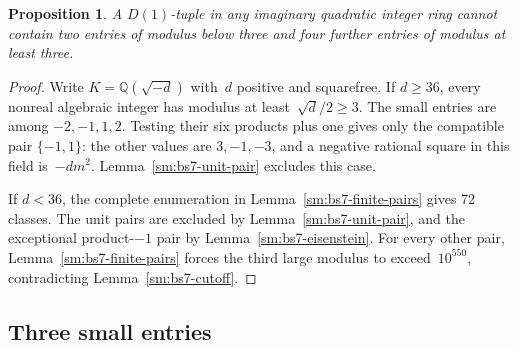 \documentclass[12pt]{article}
\newtheorem{proposition}[theorem]{Proposition}
\numberwithin{equation}{section}
\begin{document}
\begin{proposition}\label{sm:five-two-small-four-large}
A $D(1)$-tuple in any imaginary quadratic integer ring cannot contain two entries of modulus below three and four further entries of modulus at least three.
\end{proposition}
\begin{proof}
Write $K=\mathbb Q(\sqrt{-d})$ with~$d$ positive and squarefree. If $d\ge36$, every nonreal algebraic integer has modulus at least~$\sqrt d/2\ge3$. The small entries are among $-2,-1,1,2$. Testing their six products plus one gives only the compatible pair $\{-1,1\}$: the other values are $3,-1,-3$, and a negative rational square in this field is~$-dm^2$. Lemma~\ref{sm:bs7-unit-pair} excludes this case.

If $d<36$, the complete enumeration in Lemma~\ref{sm:bs7-finite-pairs} gives 72 classes. The unit pairs are excluded by Lemma~\ref{sm:bs7-unit-pair}, and the exceptional product-$-1$ pair by Lemma~\ref{sm:bs7-eisenstein}. For every other pair, Lemma~\ref{sm:bs7-finite-pairs} forces the third large modulus to exceed~$10^{550}$, contradicting Lemma~\ref{sm:bs7-cutoff}.
\end{proof}




\subsection{Three small entries}
\end{document}
